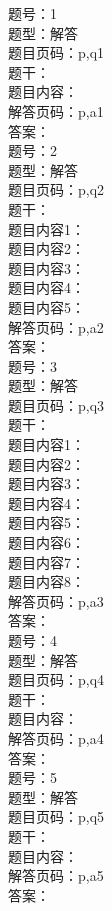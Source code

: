 \documentclass[11pt]{article}
\theoremstyle{definition}
\begin{document}
\begin{CJK*}{UTF8}{gbsn}
题号：1\\
题型：解答\\
题目页码：p,q1\\
题干：\\
题目内容：\\
解答页码：p,a1\\
答案：\\

题号：2\\
题型：解答\\
题目页码：p,q2\\
题干：\\
题目内容1：\\
题目内容2：\\
题目内容3：\\
题目内容4：\\
题目内容5：\\
解答页码：p,a2\\
答案：\\

题号：3\\
题型：解答\\
题目页码：p,q3\\
题干：\\
题目内容1：\\
题目内容2：\\
题目内容3：\\
题目内容4：\\
题目内容5：\\
题目内容6：\\
题目内容7：\\
题目内容8：\\
解答页码：p,a3\\
答案：\\

题号：4\\
题型：解答\\
题目页码：p,q4\\
题干：\\
题目内容：\\
解答页码：p,a4\\
答案：\\

题号：5\\
题型：解答\\
题目页码：p,q5\\
题干：\\
题目内容：\\
解答页码：p,a5\\
答案：\\

\end{CJK*}
\end{document}
